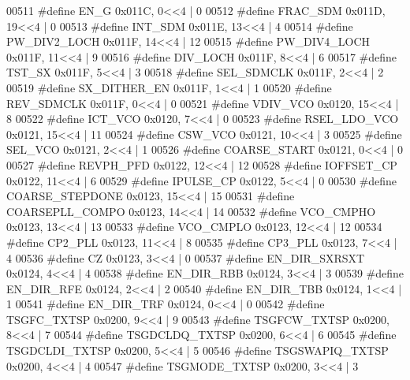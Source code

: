 \begin{DoxyCode}
00511 \textcolor{preprocessor}{#define EN\_G 0x011C, 0<<4 |  0}
00512 \textcolor{preprocessor}{#define FRAC\_SDM 0x011D, 19<<4 |  0}
00513 \textcolor{preprocessor}{#define INT\_SDM 0x011E, 13<<4 |  4}
00514 \textcolor{preprocessor}{#define PW\_DIV2\_LOCH 0x011F, 14<<4 |  12}
00515 \textcolor{preprocessor}{#define PW\_DIV4\_LOCH 0x011F, 11<<4 |  9}
00516 \textcolor{preprocessor}{#define DIV\_LOCH 0x011F, 8<<4 |  6}
00517 \textcolor{preprocessor}{#define TST\_SX 0x011F, 5<<4 |  3}
00518 \textcolor{preprocessor}{#define SEL\_SDMCLK 0x011F, 2<<4 |  2}
00519 \textcolor{preprocessor}{#define SX\_DITHER\_EN 0x011F, 1<<4 |  1}
00520 \textcolor{preprocessor}{#define REV\_SDMCLK 0x011F, 0<<4 |  0}
00521 \textcolor{preprocessor}{#define VDIV\_VCO 0x0120, 15<<4 |  8}
00522 \textcolor{preprocessor}{#define ICT\_VCO 0x0120, 7<<4 |  0}
00523 \textcolor{preprocessor}{#define RSEL\_LDO\_VCO 0x0121, 15<<4 |  11}
00524 \textcolor{preprocessor}{#define CSW\_VCO 0x0121, 10<<4 |  3}
00525 \textcolor{preprocessor}{#define SEL\_VCO 0x0121, 2<<4 |  1}
00526 \textcolor{preprocessor}{#define COARSE\_START 0x0121, 0<<4 |  0}
00527 \textcolor{preprocessor}{#define REVPH\_PFD 0x0122, 12<<4 |  12}
00528 \textcolor{preprocessor}{#define IOFFSET\_CP 0x0122, 11<<4 |  6}
00529 \textcolor{preprocessor}{#define IPULSE\_CP 0x0122, 5<<4 |  0}
00530 \textcolor{preprocessor}{#define COARSE\_STEPDONE 0x0123, 15<<4 |  15}
00531 \textcolor{preprocessor}{#define COARSEPLL\_COMPO 0x0123, 14<<4 |  14}
00532 \textcolor{preprocessor}{#define VCO\_CMPHO 0x0123, 13<<4 |  13}
00533 \textcolor{preprocessor}{#define VCO\_CMPLO 0x0123, 12<<4 |  12}
00534 \textcolor{preprocessor}{#define CP2\_PLL 0x0123, 11<<4 |  8}
00535 \textcolor{preprocessor}{#define CP3\_PLL 0x0123, 7<<4 |  4}
00536 \textcolor{preprocessor}{#define CZ 0x0123, 3<<4 |  0}
00537 \textcolor{preprocessor}{#define EN\_DIR\_SXRSXT 0x0124, 4<<4 |  4}
00538 \textcolor{preprocessor}{#define EN\_DIR\_RBB 0x0124, 3<<4 |  3}
00539 \textcolor{preprocessor}{#define EN\_DIR\_RFE 0x0124, 2<<4 |  2}
00540 \textcolor{preprocessor}{#define EN\_DIR\_TBB 0x0124, 1<<4 |  1}
00541 \textcolor{preprocessor}{#define EN\_DIR\_TRF 0x0124, 0<<4 |  0}
00542 \textcolor{preprocessor}{#define TSGFC\_TXTSP 0x0200, 9<<4 |  9}
00543 \textcolor{preprocessor}{#define TSGFCW\_TXTSP 0x0200, 8<<4 |  7}
00544 \textcolor{preprocessor}{#define TSGDCLDQ\_TXTSP 0x0200, 6<<4 |  6}
00545 \textcolor{preprocessor}{#define TSGDCLDI\_TXTSP 0x0200, 5<<4 |  5}
00546 \textcolor{preprocessor}{#define TSGSWAPIQ\_TXTSP 0x0200, 4<<4 |  4}
00547 \textcolor{preprocessor}{#define TSGMODE\_TXTSP 0x0200, 3<<4 |  3}

\end{DoxyCode}
